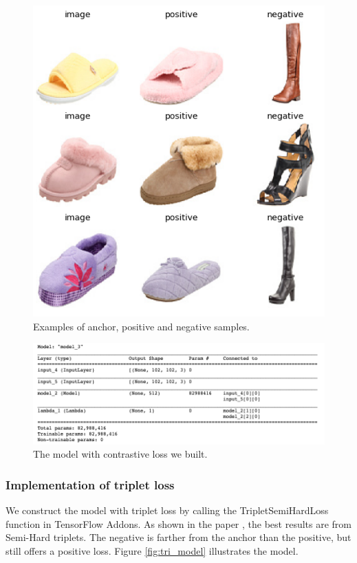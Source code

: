 \begin{figure}[h]
  \centering
  \includegraphics[width=0.9\linewidth]{figs/threesamples.png}
  \caption{Examples of anchor, positive and negative samples.}
  \label{fig:threesamples}
\end{figure}

\begin{figure}[h]
  \centering
  \includegraphics[width=\linewidth]{figs/contra_model.png}
  \caption{The model with contrastive loss we built.}
  \label{fig:contra_model}
\end{figure}

\subsubsection{Implementation of triplet loss}
We construct the model with triplet loss by calling the TripletSemiHardLoss function in TensorFlow Addons. As shown in the paper \cite{}, the best results are from Semi-Hard triplets. The negative is farther from the anchor than the positive, but still offers a positive loss. Figure \ref{fig:tri_model} illustrates the model. 

